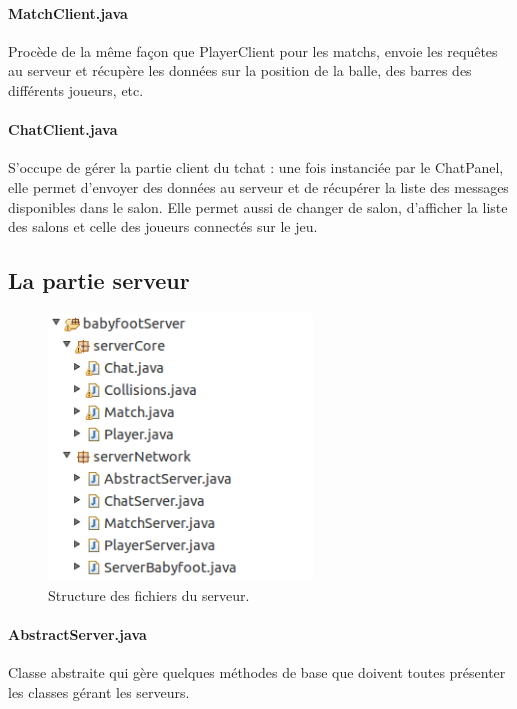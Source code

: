 \documentclass[a4paper,12pt]{report}
\begin{document}
\paragraph{MatchClient.java}
Procède de la même façon que PlayerClient pour les matchs, envoie les requêtes au serveur et récupère les données sur la position de la balle, des barres des différents joueurs, etc.
\paragraph{ChatClient.java}
S'occupe de gérer la partie client du tchat : une fois instanciée par le ChatPanel, elle permet d'envoyer des données au serveur et de récupérer la liste des messages disponibles dans le salon. Elle permet aussi de changer de salon, d'afficher la liste des salons et celle des joueurs connectés sur le jeu.
\subsection{La partie serveur}
\begin{figure}[H]
	\begin{center}
	\includegraphics[width=07cm]{pictures/structureserveur.png} 
	\end{center}
	\caption{Structure des fichiers du serveur.}
    \end{figure}
\paragraph{AbstractServer.java}
Classe abstraite qui gère quelques méthodes de base que doivent toutes présenter les classes gérant les serveurs.
\end{document}
